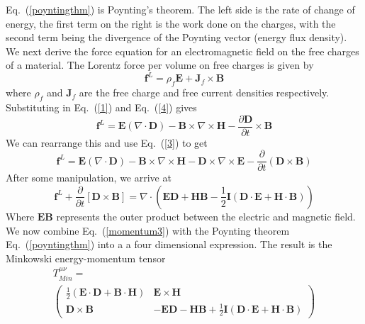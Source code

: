 \documentclass[twocolumn,english,pra,aps,superscriptaddress,floatfix]{revtex4-1}
\begin{document}
Eq.\ (\ref{poyntingthm}) is Poynting's theorem.  The left side is the rate of change of energy, the first term on the right is the work done on the charges, with the second term being the divergence of the Poynting vector (energy flux density).
We next derive the force equation for an electromagnetic field on the free charges of a material. The Lorentz force per volume on free charges is given by 
\begin{equation}
\mathbf{f}^L=\rho_f \mathbf{E}+\mathbf{J}_f\times\mathbf{B}
\end{equation}
where $\rho_f$ and $\mathbf{J}_f$ are the free charge and free current densities respectively.  Substituting in  Eq.\ (\ref{1}) and  Eq.\ (\ref{4}) gives
\begin{equation}
\mathbf{f}^L=\mathbf{E}\left(\nabla\cdot\mathbf{D}\right) -\mathbf{B}\times\nabla\times\mathbf{H}-\frac{\partial\mathbf{D}}{\partial t}\times\mathbf{B}
\end{equation}
We can rearrange this and use Eq.\ (\ref{3}) to get
\begin{equation}
\mathbf{f}^L=\mathbf{E}\left(\nabla\cdot\mathbf{D}\right) -\mathbf{B}\times\nabla\times\mathbf{H}-\mathbf{D}\times\nabla\times\mathbf{E}-\frac{\partial}{\partial t}\left(\mathbf{D}\times\mathbf{B}\right)
\label{minkowskiforce1}
\end{equation}
After some manipulation, we arrive at
\begin{equation}
\mathbf{f}^L+\frac{\partial}{\partial t}\left[\mathbf{D}\times\mathbf{B}\right]=\nabla\cdot\left(\mathbf{E}\mathbf{D}+\mathbf{H}\mathbf{B}-\frac{1}{2}\mathbf{I}\left(\mathbf{D}\cdot\mathbf{E}+\mathbf{H}\cdot\mathbf{B}\right)\right)
\label{momentum3}
\end{equation}
Where $\mathbf{E}\mathbf{B}$ represents the outer product between the electric and magnetic field. We now combine  Eq.\ (\ref{momentum3}) with the Poynting theorem  Eq.\ (\ref{poyntingthm}) into a a four dimensional expression. The result is the Minkowski energy-momentum tensor
\begin{align}
&T^{\mu\nu}_{Min} =& \nonumber \\ &\begin{pmatrix} \frac{1}{2}\left(\mathbf{E}\cdot\mathbf{D} + \mathbf{B}\cdot\mathbf{H}\right) & \mathbf{E}\times\mathbf{H} \\  \mathbf{D}\times\mathbf{B} & -\mathbf{E}\mathbf{D}-\mathbf{H}\mathbf{B}+\frac{1}{2}\mathbf{I}\left(\mathbf{D}\cdot\mathbf{E}+\mathbf{H}\cdot\mathbf{B}\right) \end{pmatrix}&
\label{tensor}
\end{align}
\end{document}
